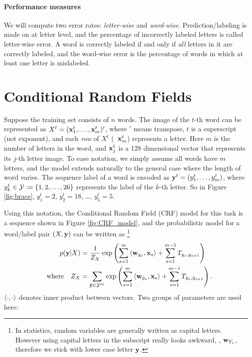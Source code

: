 \documentclass[11pt]{report}
\begin{document}
	\paragraph{Performance measures}
	We will compute two error rates: \emph{letter-wise} and \emph{word-wise}.
	Prediction/labeling is made on at letter level,
	and the percentage of incorrectly labeled letters is called letter-wise error.
	A word is correctly labeled if and only if \emph{all} letters in it are correctly labeled,
	and the word-wise error is the percentage of words in which at least one letter is mislabeled.
	
	
	\section{Conditional Random Fields}
	
	Suppose the training set consists of $n$ words.
	The image of the $t$-th word can be represented as
	$X^t = (\mathbf{\boldsymbol{x}}^t_1, \ldots, \mathbf{\boldsymbol{x}}^t_m)'$,
	where $'$ means transpose,
	$t$ is a superscript (not exponent),
	and each \emph{row} of $X^t$ (\eg\ $\mathbf{\boldsymbol{x}}^t_m$) represents a letter.
	Here $m$ is the number of letters in the word,
	and $\mathbf{\boldsymbol{x}}^t_j$ is a 128 dimensional vector that represents its $j$-th letter image.
	To ease notation, we simply assume all words have $m$ letters,
	and the model extends naturally to the general case where the length of word varies.
	The sequence label of a word is encoded as
	$\mathbf{\boldsymbol{y}}^t = (y^t_1, \ldots, y^t_m)$,
	where $y^t_k \in \mathcal{Y} := \{1, 2, \ldots, 26\}$ represents the label of the $k$-th letter.
	So in Figure \ref{fig:brace}, $y^t_1 = 2$, $y^t_2 = 18$, \ldots, $y^t_5 = 5$.
	
	Using this notation, the Conditional Random Field (CRF) model for this task is a sequence shown in Figure \ref{fig:CRF_model},
	and the probabilistic model for a word/label pair $(X, \mathbf{\boldsymbol{y}})$ can be written as%
	\footnote{In statistics, random variables are generally written as capital letters.
		However using capital letters in the subscript really looks awkward, \eg, $\mathbf{\boldsymbol{w}}_{Y_s}$,
		therefore we stick with lower case letter $\mathbf{\boldsymbol{y}}$.}
	\begin{align}
		\label{eq:crf}
		p(\mathbf{\boldsymbol{y}} | X ) &= \frac{1}{Z_X} \exp \left(\sum_{s=1}^m \left\langle \mathbf{\boldsymbol{w}}_{y_s},\mathbf{\boldsymbol{x}}_s \right\rangle + \sum_{s=1}^{m-1} T_{y_s, y_{s+1}}\right) \\
		{\quad \text{where} \quad} Z_X &= \sum_{\hat{\mathbf{\boldsymbol{y}}} \in \mathcal{Y}^m} \exp \left(\sum_{s=1}^m \left\langle \mathbf{\boldsymbol{w}}_{\hat{y}_s},\mathbf{\boldsymbol{x}}_s \right\rangle + \sum_{s=1}^{m-1} T_{\hat{y}_s, \hat{y}_{s+1}}\right).
	\end{align}
	$\left\langle \cdot,\cdot \right\rangle$ denotes inner product between vectors.
	Two groups of parameters are used here:
	
\end{document}
